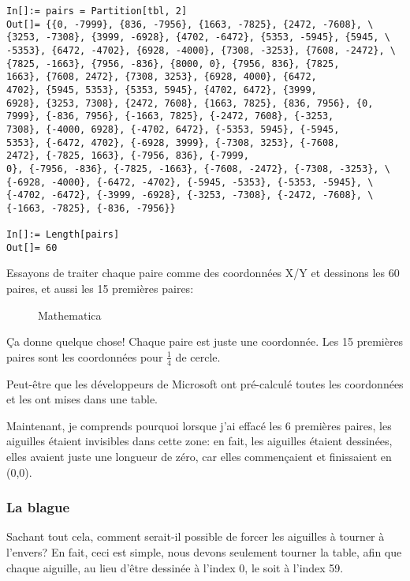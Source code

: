 \begin{lstlisting}[style=custommath]
In[]:= pairs = Partition[tbl, 2]
Out[]= {{0, -7999}, {836, -7956}, {1663, -7825}, {2472, -7608}, \
{3253, -7308}, {3999, -6928}, {4702, -6472}, {5353, -5945}, {5945, \
-5353}, {6472, -4702}, {6928, -4000}, {7308, -3253}, {7608, -2472}, \
{7825, -1663}, {7956, -836}, {8000, 0}, {7956, 836}, {7825, 
1663}, {7608, 2472}, {7308, 3253}, {6928, 4000}, {6472, 
4702}, {5945, 5353}, {5353, 5945}, {4702, 6472}, {3999, 
6928}, {3253, 7308}, {2472, 7608}, {1663, 7825}, {836, 7956}, {0, 
7999}, {-836, 7956}, {-1663, 7825}, {-2472, 7608}, {-3253, 
7308}, {-4000, 6928}, {-4702, 6472}, {-5353, 5945}, {-5945, 
5353}, {-6472, 4702}, {-6928, 3999}, {-7308, 3253}, {-7608, 
2472}, {-7825, 1663}, {-7956, 836}, {-7999, 
0}, {-7956, -836}, {-7825, -1663}, {-7608, -2472}, {-7308, -3253}, \
{-6928, -4000}, {-6472, -4702}, {-5945, -5353}, {-5353, -5945}, \
{-4702, -6472}, {-3999, -6928}, {-3253, -7308}, {-2472, -7608}, \
{-1663, -7825}, {-836, -7956}}

In[]:= Length[pairs]
Out[]= 60
\end{lstlisting}

Essayons de traiter chaque paire comme des coordonnées X/Y et dessinons les 60 paires,
et aussi les 15 premières paires:

\begin{figure}[H]
\centering
{}
\caption{Mathematica}
\end{figure}

Ça donne quelque chose!
Chaque paire est juste une coordonnée.
Les 15 premières paires sont les coordonnées pour $\frac{1}{4}$ de cercle.

Peut-être que les développeurs de Microsoft ont pré-calculé toutes les coordonnées
et les ont mises dans une table.

Maintenant, je comprends pourquoi lorsque j'ai effacé les 6 premières paires, les
aiguilles étaient invisibles dans cette zone: en fait, les aiguilles étaient dessinées,
elles avaient juste une longueur de zéro, car elles commençaient et finissaient en (0,0).

\subsubsection{La blague}

Sachant tout cela, comment serait-il possible de forcer les aiguilles à tourner à
l'envers?
En fait, ceci est simple, nous devons seulement tourner la table, afin que chaque
aiguille, au lieu d'être dessinée à l'index 0, le soit à l'index 59.

